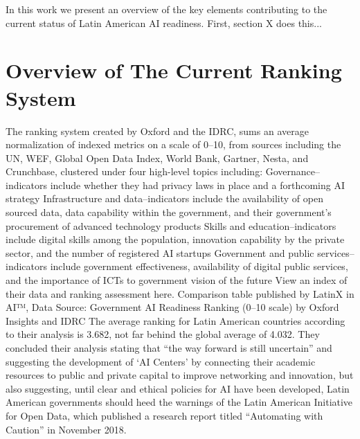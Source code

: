 \documentclass[conference]{IEEEtran}
\begin{document}
In this work we present an overview of the key elements contributing to the current status of Latin American AI readiness. First, section X does this...

\section{Overview of The Current Ranking System}

The ranking system created by Oxford and the IDRC, sums an average normalization of indexed metrics on a scale of 0–10, from sources including the UN, WEF, Global Open Data Index, World Bank, Gartner, Nesta, and Crunchbase, clustered under four high-level topics including:
Governance--indicators include whether they had privacy laws in place and a forthcoming AI strategy
Infrastructure and data--indicators include the availability of open sourced data, data capability within the government, and their government's procurement of advanced technology products
Skills and education--indicators include digital skills among the population, innovation capability by the private sector, and the number of registered AI startups
Government and public services--indicators include government effectiveness, availability of digital public services, and the importance of ICTs to government vision of the future
View an index of their data and ranking assessment here.
Comparison table published by LatinX in AI™, Data Source: Government AI Readiness Ranking (0–10 scale) by Oxford Insights and IDRC
The average ranking for Latin American countries according to their analysis is 3.682, not far behind the global average of 4.032. They concluded their analysis stating that ``the way forward is still uncertain'' and suggesting the development of ‘AI Centers' by connecting their academic resources to public and private capital to improve networking and innovation, but also suggesting, until clear and ethical policies for AI have been developed, Latin American governments should heed the warnings of the Latin American Initiative for Open Data, which published a research report titled ``Automating with Caution'' in November 2018.
\end{document}
